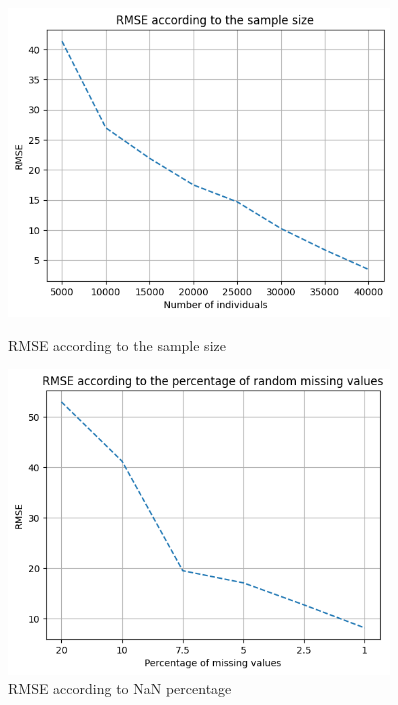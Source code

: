 \documentclass[]{article}
\begin{document}
\begin{figure}[!h]
	\centering
	\begin{minipage}{0.45\textwidth}
		\centering
		\includegraphics[width=0.9\textwidth]{tSNE_GHI_RMSE_according_to_sample_size.png} %
		\caption{RMSE according to the sample size}
		\label{RMSE_according_to_sample_size}
	\end{minipage}\hfill
	\begin{minipage}{0.45\textwidth}
		\centering
		\includegraphics[width=0.9\textwidth]{tSNE_GHI_RMSE_according_to_percentage_NaN.png} %
		\caption{RMSE according to NaN percentage}
		\label{RMSE_according_to_percentage_nan}
	\end{minipage}
\end{figure}
\end{document}
